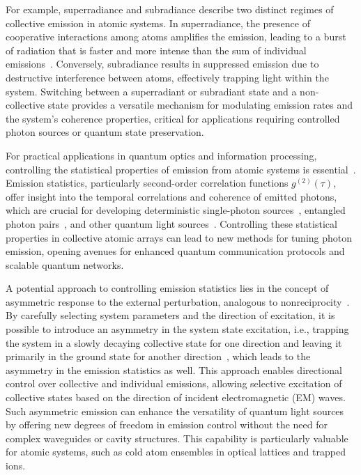 \documentclass[aps,prl,twocolumn,superscriptaddress,showpacs,amsmath,amssymb]{revtex4-2}
\begin{document}
For example, superradiance and subradiance describe two distinct regimes of collective emission in atomic systems. 
In superradiance, the presence of cooperative interactions among atoms amplifies the emission, leading to a burst of radiation that is faster and more intense than the sum of individual emissions~\cite{gross1982superradiance,nefedkin2016superradiance}. 
Conversely, subradiance results in suppressed emission due to destructive interference between atoms, effectively trapping light within the system. 
Switching between a superradiant or subradiant state and a non-collective state provides a versatile mechanism for modulating emission rates and the system's coherence properties, critical for applications requiring controlled photon sources or quantum state preservation.

For practical applications in quantum optics and information processing, controlling the statistical properties of emission from atomic systems is essential~\cite{mandel1995optical}. 
Emission statistics, particularly second-order correlation functions $g^{(2)}(\tau)$, offer insight into the temporal correlations and coherence of emitted photons, which are crucial for developing deterministic single-photon sources~\cite{lounis2005single}, entangled photon
pairs~\cite{erhard2020advances}, and other quantum light sources~\cite{o2009photonic}. 
Controlling these statistical properties in collective atomic arrays can lead to new methods for tuning photon emission, opening avenues for enhanced quantum communication protocols and scalable quantum networks.

A potential approach to controlling emission statistics lies in the concept of asymmetric response to the external perturbation, analogous to nonreciprocity~\cite{caloz2018electromagnetic,nassar2020nonreciprocity,sounas2018broadband,hamann2018nonreciprocity,muller2017nonreciprocal}. 
By carefully selecting system parameters and the direction of excitation, it is possible to introduce an asymmetry in the system state excitation, i.e., trapping the system in a slowly decaying collective state for one direction and leaving it primarily in the ground state for another direction~\cite{hamann2018nonreciprocity, muller2017nonreciprocal, nefedkin2022dark}, which leads to the asymmetry in the emission statistics as well. 
This approach enables directional control over collective and individual emissions, allowing selective excitation of collective states based on the direction of incident electromagnetic (EM) waves. 
Such asymmetric emission can enhance the versatility of quantum light sources by offering new degrees of freedom in emission control without the need for complex waveguides or cavity structures. 
This capability is particularly valuable for atomic systems, such as cold atom ensembles in optical lattices and trapped ions. 
\end{document}
